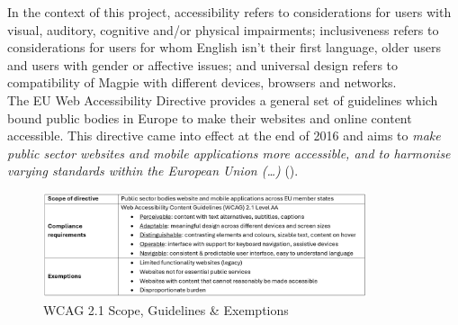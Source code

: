 In the context of this project, accessibility refers to considerations for users with visual, auditory, cognitive and/or physical impairments; inclusiveness refers to considerations for users for whom English isn't their first language, older users and users with gender or affective issues; and universal design refers to compatibility of Magpie with different devices, browsers and networks.\\

\noindent The EU Web Accessibility Directive provides a general set of guidelines which bound public bodies in Europe to make their websites and online content accessible. This directive came into effect at the end of 2016 and aims to \emph{make public sector websites and mobile applications more accessible, and to harmonise varying standards within the European Union (\ldots)} (\cite{webaccessibilitydirective2016}).\\
\begin{figure}[h!]
    \centering
    \includegraphics[width=0.85\textwidth]{images/wcag-guidelines.png}
    \caption{WCAG 2.1 Scope, Guidelines \& Exemptions}
\end{figure}

